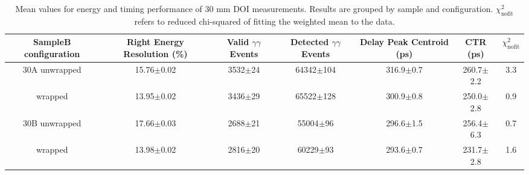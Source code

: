 \begin{table}
\caption{\label{tab:doictrresults} Mean values for energy and timing performance of 30 mm DOI measurements. Results are grouped by sample and configuration. $\chi^2_\text{nofit}$ refers to reduced chi-squared of fitting the weighted mean to the data.}
\begin{tabular}{ccccccc}
\hline
SampleB configuration & Right Energy Resolution (\%) & Valid $\gamma\gamma$ Events & Detected $\gamma\gamma$ Events & Delay Peak Centroid (ps)  & CTR (ps) &  $\chi^2_\text{nofit}$ \\
\hline
30A     unwrapped     &  15.76$\pm$0.02 &  3532$\pm$24 &  64342$\pm$104 &  316.9$\pm$0.7 &  260.7$\pm$2.2 &    3.3 \\
        wrapped       &  13.95$\pm$0.02 &  3436$\pm$29 &  65522$\pm$128 &  300.9$\pm$0.8 &  250.0$\pm$2.8 &    0.9 \\
30B     unwrapped     &  17.66$\pm$0.03 &  2688$\pm$21 &   55004$\pm$96 &  296.6$\pm$1.5 &  256.4$\pm$6.3 &    0.7 \\
        wrapped       &  13.98$\pm$0.02 &  2816$\pm$20 &   60229$\pm$93 &  293.6$\pm$0.7 &  231.7$\pm$2.8 &    1.6 \\
\hline
\end{tabular}
\end{table}
